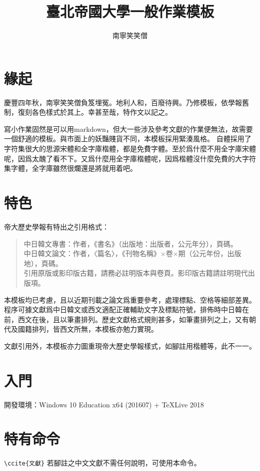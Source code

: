 \documentclass[12pt]{NTUhw}
\title{臺北帝國大學一般作業模板}
\author{南寧笑笑僧}
\begin{document}
\maketitle

\section*{緣起}

慶豐四年秋，南寧笑笑僧負笈埋冤。地利人和，百廢待興。乃修模板，依學報舊制，復刻各色樣式於其上。幸甚至哉，特作文以記之。

寫小作業固然是可以用markdown，但大一些涉及參考文獻的作業便無法，故需要一個舒適的模板。與市面上的妖豔賤貨不同，本模板採用緊湊風格。
自體採用了字符集很大的思源宋體和全字庫楷體，都是免費字體。至於爲什麼不用全字庫宋體呢，因爲太醜了看不下。又爲什麼用全字庫楷體呢，因爲楷體沒什麼免費的大字符集字體，全字庫雖然很爛還是將就用着吧。

\section*{特色}

帝大歷史學報有特出之引用格式：
\begin{quote}
中日韓文專書：作者，《書名》（出版地：出版者，公元年分），頁碼。\\
中日韓文論文：作者，〈篇名〉，《刊物名稱》×卷×期（公元年份，出版地），頁碼。\\
引用原版或影印版古籍，請務必註明版本與卷頁。影印版古籍請註明現代出版項。
\end{quote}
本模板均已考慮，且以近期刊載之論文爲重要參考，處理標點、空格等細部差異。程序可據文獻爲中日韓文或西文適配正確輔助文字及標點符號，排佈時中日韓在前，西文在後，且以筆畫排列。歷史文獻格式規則甚多，如筆畫排列之上，又有朝代及國籍排列，皆西文所無，本模板亦勉力實現。

文獻引用外，本模板亦力圖重現帝大歷史學報樣式，如腳註用楷體等，此不一一。

\section*{入門}

開發環境：Windows 10 Education x64 (201607) + TeXLive 2018

\section*{特有命令}

\verb|\ccite{文獻}| 若腳註之中文文獻不需任何說明，可使用本命令。
\end{document}
